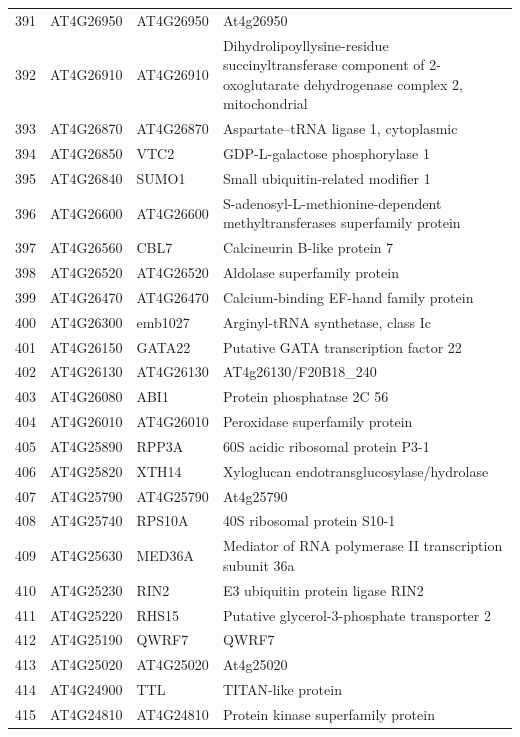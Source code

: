 \documentclass[11pt]{article}
\begin{document}
\begin{center}
\begin{tabular}{rlll}
391 & AT4G26950 & AT4G26950 & At4g26950\\
392 & AT4G26910 & AT4G26910 & Dihydrolipoyllysine-residue succinyltransferase component of 2-oxoglutarate dehydrogenase complex 2, mitochondrial\\
393 & AT4G26870 & AT4G26870 & Aspartate--tRNA ligase 1, cytoplasmic\\
394 & AT4G26850 & VTC2 & GDP-L-galactose phosphorylase 1\\
395 & AT4G26840 & SUMO1 & Small ubiquitin-related modifier 1\\
396 & AT4G26600 & AT4G26600 & S-adenosyl-L-methionine-dependent methyltransferases superfamily protein\\
397 & AT4G26560 & CBL7 & Calcineurin B-like protein 7\\
398 & AT4G26520 & AT4G26520 & Aldolase superfamily protein\\
399 & AT4G26470 & AT4G26470 & Calcium-binding EF-hand family protein\\
400 & AT4G26300 & emb1027 & Arginyl-tRNA synthetase, class Ic\\
401 & AT4G26150 & GATA22 & Putative GATA transcription factor 22\\
402 & AT4G26130 & AT4G26130 & AT4g26130/F20B18\_240\\
403 & AT4G26080 & ABI1 & Protein phosphatase 2C 56\\
404 & AT4G26010 & AT4G26010 & Peroxidase superfamily protein\\
405 & AT4G25890 & RPP3A & 60S acidic ribosomal protein P3-1\\
406 & AT4G25820 & XTH14 & Xyloglucan endotransglucosylase/hydrolase\\
407 & AT4G25790 & AT4G25790 & At4g25790\\
408 & AT4G25740 & RPS10A & 40S ribosomal protein S10-1\\
409 & AT4G25630 & MED36A & Mediator of RNA polymerase II transcription subunit 36a\\
410 & AT4G25230 & RIN2 & E3 ubiquitin protein ligase RIN2\\
411 & AT4G25220 & RHS15 & Putative glycerol-3-phosphate transporter 2\\
412 & AT4G25190 & QWRF7 & QWRF7\\
413 & AT4G25020 & AT4G25020 & At4g25020\\
414 & AT4G24900 & TTL & TITAN-like protein\\
415 & AT4G24810 & AT4G24810 & Protein kinase superfamily protein\\

\end{tabular}
\end{center}
\end{document}
